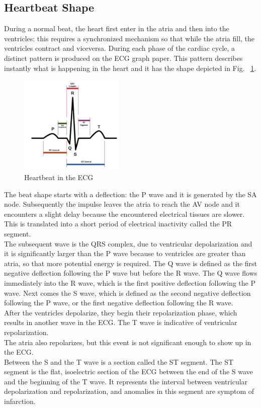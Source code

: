 \documentclass[LaM,binding=0.6cm]{sapthesis}
\begin{document}
\subsection{Heartbeat Shape}
During a normal beat, the heart first enter in the atria and then into the ventricles: this requires a synchronized mechanism so that while the atria fill, the ventricles contract and viceversa. During each phase of the cardiac cycle, a distinct pattern is produced on the ECG graph paper. This pattern describes instantly what is happening in the heart and it has the shape depicted in Fig. ~\ref{fig:beatshape}.
\begin{figure}[H]
	\includegraphics[width=50mm,scale=0.7]{beatshape}
	\caption{Heartbeat in the ECG}
	\label{fig:beatshape}
\end{figure}
The beat shape starts with a deflection: the P wave and it is generated by the SA node. Subsequently the impulse leaves the atria to reach the AV node and it encounters a slight delay because the encountered electrical tissues are slower. This is translated into a short period of electrical inactivity called the PR segment.\\The subsequent wave is the QRS complex, due to ventricular depolarization and it is significantly larger than the P wave because to  ventricles are greater than atria, so that more potential energy is required. The Q wave is defined as the first negative deflection following the P wave but before the R wave. The Q wave flows immediately into the R wave, which is the first positive deflection following the P wave. Next comes the S wave, which is defined as the second negative deflection following the P wave, or the first negative deflection following the R wave.\\After the ventricles depolarize, they begin their repolarization phase, which results in another wave in the ECG. The T wave is indicative of ventricular repolarization.\\The atria also repolarizes, but this event is not significant enough to show up in the ECG.\\Between the S and the T wave is a section called the ST segment. The ST segment is the flat, isoelectric section of the ECG between the end of the S wave and the beginning of the T wave. It represents the interval between ventricular depolarization and repolarization, and anomalies in this segment are symptom of infarction.
\end{document}
